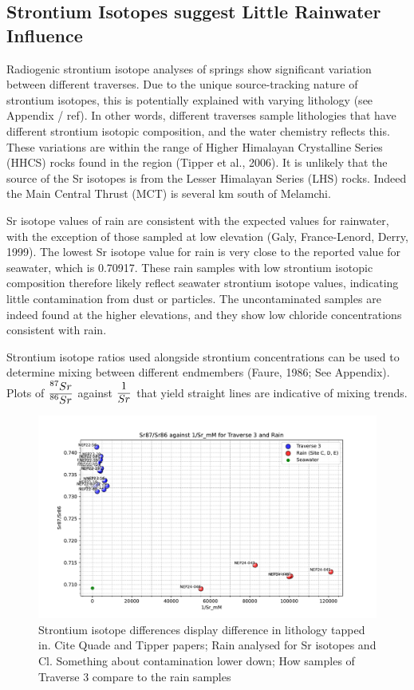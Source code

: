 \subsection{Strontium Isotopes suggest Little Rainwater Influence}

Radiogenic strontium isotope analyses of springs show significant variation between different traverses. Due to the unique source-tracking nature of strontium isotopes, this is potentially explained with varying lithology (see Appendix / ref). In other words, different traverses sample lithologies that have different strontium isotopic composition, and the water chemistry reflects this. These variations are within the range of Higher Himalayan Crystalline Series (HHCS) rocks found in the region (Tipper et al., 2006). It is unlikely that the source of the Sr isotopes is from the Lesser Himalayan Series (LHS) rocks. Indeed the Main Central Thrust (MCT) is several km south of Melamchi.

\bsk

Sr isotope values of rain are consistent with the expected values for rainwater, with the exception of those sampled at low elevation (Galy, France-Lenord, Derry, 1999). The lowest Sr isotope value for rain is very close to the reported value for seawater, which is 0.70917. These rain samples with low strontium isotopic composition therefore likely reflect seawater strontium isotope values, indicating little contamination from dust or particles. The uncontaminated samples are indeed found at the higher elevations, and they show low chloride concentrations consistent with rain.

\bsk

Strontium isotope ratios used alongside strontium concentrations can be used to determine mixing between different endmembers (Faure, 1986; See Appendix). Plots of $\ddfrac{^{87}Sr}{^{86}Sr}$ against $\ddfrac{1}{Sr}$ that yield straight lines are indicative of mixing trends. 

\begin{figure}[p]
    \centering
    \includegraphics[width=\textwidth]{Sr87_Sr86_1Sr_Rain.pdf}
    \caption{Strontium isotope differences display difference in lithology tapped in. Cite Quade and Tipper papers; Rain analysed for Sr isotopes and Cl. Something about contamination lower down; How samples of Traverse 3 compare to the rain samples}
    \label{fig:discussion3}
\end{figure}

